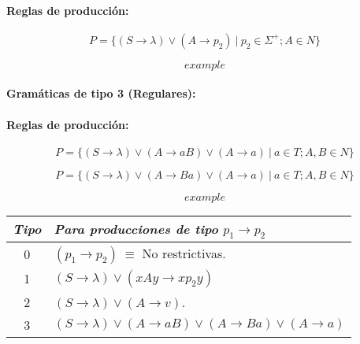 {\paragraph*{Reglas de producción:}

\begin{equation}
P = \{(S \rightarrow \lambda) \vee (A \rightarrow p_2)\ |\ p_2 \in \Sigma^+; A
\in N\} 
\end{equation}

\ejem 

\begin{equation}
example
\end{equation}

\paragraph*{Gramáticas de tipo 3 (Regulares):}

\paragraph*{Reglas de producción:}

\begin{equation}
P = \{(S \rightarrow \lambda) \vee (A \rightarrow aB) \vee (A \rightarrow a)\ |\
a \in T; A,B \in N\} 
\end{equation}

\begin{equation}
P = \{(S \rightarrow \lambda) \vee (A \rightarrow Ba) \vee (A \rightarrow a)\ |\
a \in T; A,B \in N\} 
\end{equation}

\ejem 

\begin{equation}
example
\end{equation}

\begin{table}[h]

\begin{center}

\begin{tabular}{|c|l|}\hline
\textit{Tipo} & \textit{Para producciones de tipo} $p_1 \longrightarrow p_2$ \\
\hline
\hline
0 & $(p_1 \rightarrow p_2)\ \equiv$ No restrictivas. \\ \hline
1 & $(S \rightarrow \lambda) \vee (xAy \rightarrow xp_2y) $ \\ \hline
2 & $(S \rightarrow \lambda) \vee (A \rightarrow v)$. \\ \hline
3 & $(S \rightarrow \lambda) \vee (A \rightarrow aB) \vee (A \rightarrow Ba)
\vee (A \rightarrow a)$ \\ \hline
\end{tabular}


\end{center}
\end{table}}
